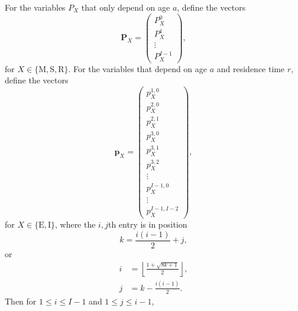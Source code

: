 \documentclass[12pt]{article}
\renewcommand{\vec}[1]{\mathbf{#1}}
\begin{document}
For the variables $P_X$ that only depend on age $a$,
define the vectors
\begin{equation}
  \vec{P}_X =
  \begin{pmatrix}
    P_X^0\\
    P_X^1\\
    \vdots\\
    P_X^{I - 1}
  \end{pmatrix},
\end{equation}
for $X \in \{\mathrm{M}, \mathrm{S}, \mathrm{R}\}$.
For the variables that depend on age $a$ and residence time $r$,
define the vectors
\begin{equation}
  \vec{p}_X =
  \begin{pmatrix}
    p_X^{1, 0}\\
    p_X^{2, 0}\\
    p_X^{2, 1}\\
    p_X^{3, 0}\\
    p_X^{3, 1}\\
    p_X^{3, 2}\\
    \vdots\\
    p_X^{I - 1, 0}\\
    \vdots\\
    p_X^{I - 1, I - 2}
  \end{pmatrix},
\end{equation}
for $X \in \{\mathrm{E}, \mathrm{I}\}$,
where the $i, j$th entry is in position
\begin{equation}
  k = \frac{i (i - 1)}{2} + j,
\end{equation}
or
\begin{align}
  i &= \left\lfloor\frac{1 + \sqrt{8 k + 1}}{2}\right\rfloor,
  \\
  j &= k - \frac{i (i - 1)}{2}.
\end{align}
Then for $1 \leq i \leq I - 1$ and $1 \leq j \leq i - 1$,
\end{document}
